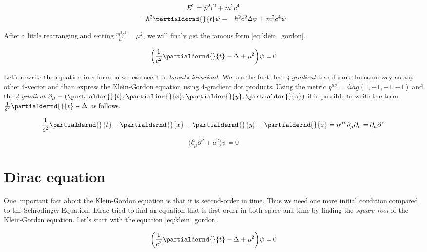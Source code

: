 \begin{equation*}
    \begin{gathered}
        E^{2} = \vec{p}^{2} c^{2} + m^{2} c^{4} \\
        - \hbar^{2} \partialdernd{}{t} \psi = - \hbar^{2} c^{2} \Delta \psi + m^{2} c^{4} \psi
    \end{gathered}
\end{equation*}

After a little rearranging and setting $\frac{m^{2} c^{2}}{\hbar^{2}} = \mu^{2}$, we will finaly get the famous form \ref{eq:klein_gordon}.

\begin{equation}
    \label{eq:klein_gordon}
    \bigg(\frac{1}{c^{2}} \partialdernd{}{t} - \Delta + \mu^{2} \bigg) \psi = 0
\end{equation}

Let's rewrite the equation in a form so we can see it is \textit{lorentz invariant}. We use the fact that \textit{4-gradient}
transforms the same way as any other 4-vector and than express the Klein-Gordon equation using 4-gradient dot products.
Using the metric $\eta^{\mu \nu} = diag(1, -1, -1, -1)$ and the \textit{4-gradient} $\partial_{\mu} = (\partialder{}{t}, \partialder{}{x}, \partialder{}{y}, \partialder{}{z})$ 
it is possible to write the term $\frac{1}{c^{2}} \partialdernd{}{t} - \Delta$ as follows.

\begin{equation*}
     \frac{1}{c^{2}} \partialdernd{}{t} - \partialdernd{}{x} - \partialdernd{}{y} - \partialdernd{}{z} = \eta^{\mu \nu} \partial_{\mu} \partial_{\nu} = \partial_{\mu} \partial^{\nu}
\end{equation*}

\begin{equation}
    \bigg(\partial_{\mu} \partial^{\nu} + \mu^{2} \bigg) \psi = 0
\end{equation}

\section{Dirac equation}

\paragraph{} One important fact about the Klein-Gordon equation is that it is second-order in time. Thus we need
one more initial condition compared to the Schrodinger Equation. Dirac tried to find an equation that is first order
in both space and time by finding the \textit{square root} of the Klein-Gordon equation. Let's start with the equation 
\ref{eq:klein_gordon}.

\begin{equation*}
    \bigg(\frac{1}{c^{2}} \partialdernd{}{t} - \Delta + \mu^{2} \bigg) \psi = 0
\end{equation*}
